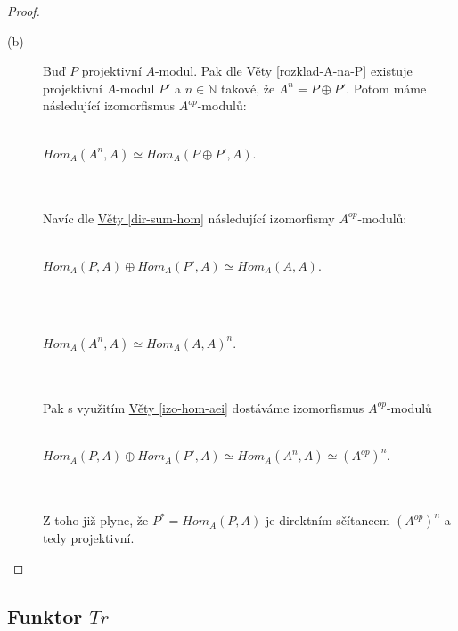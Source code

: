 \begin{proof}
\begin{description}
         \item[(b)] Buď $P$ projektivní $A$-modul. Pak dle 
         \hyperref[rozklad-A-na-P]{Věty \ref*{rozklad-A-na-P}} 
         existuje projektivní $A$-modul  $P'$ a 
         $n\in \mathbb N$ takové, že $A^n=P\oplus P'$. Potom máme následující izomorfismus 
         $A^{op}$-modulů: \\\\
         \centerline{$ Hom_A(A^n,A)\simeq Hom_A(P\oplus P', A)$.} \\\\
         Navíc dle 
         \hyperref[dir-sum-hom]{Věty \ref*{dir-sum-hom}} následující izomorfismy 
         $A^{op}$-modulů:\\\\
         \centerline{$ Hom_A(P, A) \oplus Hom_A(P', A) \simeq Hom_A(A, A)$.} \\\\
         \centerline{$ Hom_A(A^n, A) \simeq Hom_A(A, A)^n$.} \\\\
         Pak s využitím \hyperref[izo-hom-aei]{Věty \ref*{izo-hom-aei}} 
         dostáváme izomorfismus  $A^{op}$-modulů\\\\
         \centerline{$ Hom_A(P, A) \oplus Hom_A(P', A) \simeq Hom_A(A^n, A) \simeq (A^{op})^n$.} \\\\
         Z toho již plyne, že $P^*=Hom_A(P,A)$ je direktním sčítancem $(A^{op})^n$ 
         a tedy projektivní.
       \end{description}
     \end{proof}
     
   \subsection{Funktor $Tr$}
    
